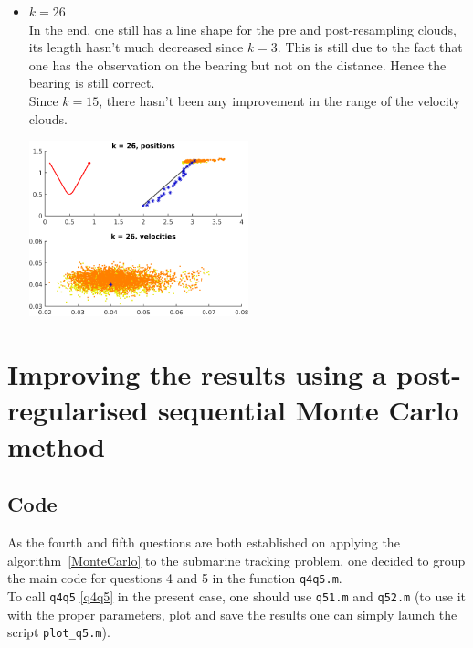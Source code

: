 \documentclass[english,DIV=13]{scrreprt}
\begin{document}
\begin{itemize}
\begin{center}
\begin{minipage}{.5\textwidth}
	\end{minipage}
\end{center}
\item $k=26$\\
In the end, one still has a line shape for the pre and post-resampling clouds, its length hasn't much decreased
since $k=3$. This is still due to the fact that one has the observation on the bearing but not on the distance.
Hence the bearing is still correct.\\
Since $k=15$, there hasn't been any improvement in the range of the velocity clouds.

  \begin{center}
		 \includegraphics[width=0.5\textwidth]{img/q4_26.png}
\end{center}
  

\end{itemize} 

\chapter{Improving the results using a post-regularised sequential Monte Carlo method}
\section*{Code}
As the fourth and fifth questions are both established on applying the algorithm~\ref{MonteCarlo}
to the submarine tracking problem, one decided to group the main code for questions 4 and 5
in the function \texttt{q4q5.m}.\\
To call \texttt{q4q5} \ref{q4q5} in the present case, one should use \texttt{q51.m} and \texttt{q52.m} 
(to use it with the proper parameters, plot and save the results one can simply launch the script \texttt{plot\_q5.m}).\\


\end{document}
